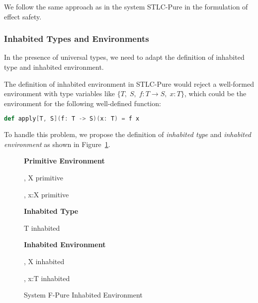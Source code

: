 We follow the same approach as in the system STLC-Pure in the
formulation of effect safety.

\subsubsection{Inhabited Types and Environments}

In the presence of universal types, we need to adapt the definition of
inhabited type and inhabited environment.

The definition of inhabited environment in STLC-Pure would reject a
well-formed environment with type variables like
$\{T, \; S, \; f: T \to S, \; x:T\}$, which could be the environment
for the following well-defined function:

\begin{lstlisting}[language=Scala]
  def apply[T, S](f: T -> S)(x: T) = f x
\end{lstlisting}

To handle this problem, we propose the definition of \emph{inhabited
  type} and \emph{inhabited environment} as shown in
Figure~\ref{fig:f-pure-inhabited}.

\begin{figure}[h]
\begin{framed}

\setlength{\columnseprule}{0.4pt}
\begin{multicols}{2}

\textbf{Primitive Environment}


{ \Sigma ,\; X \quad primitive }

{ \Sigma ,\; x:X \quad primitive }

\textbf{Inhabited Type}

{ T \quad inhabited }

\columnbreak

\textbf{Inhabited Environment}


{ \Gamma ,\; X \quad inhabited }

{ \Gamma ,\; x:T \quad inhabited }

\end{multicols}
\end{framed}

\caption{System F-Pure Inhabited Environment }
\label{fig:f-pure-inhabited}
\end{figure}

